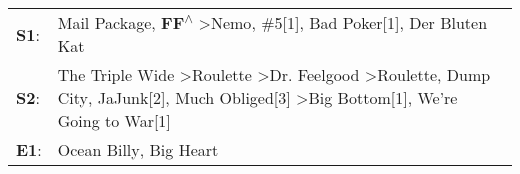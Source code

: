 \begin{supertabular}{p{0.03\textwidth}p{0.92\textwidth}}
 \textbf{S1}:  &                                                                                                                                                                        Mail Package\textsuperscript{}, \enspace \textbf{FF\textsuperscript{$\wedge$}} \textgreater \enspace Nemo\textsuperscript{}, \enspace \#5[1]\textsuperscript{}, \enspace Bad Poker[1]\textsuperscript{}, \enspace Der Bluten Kat\textsuperscript{}  \enspace  \\
 \textbf{S2}:  &  The Triple Wide\textsuperscript{} \textgreater \enspace Roulette\textsuperscript{} \textgreater \enspace Dr. Feelgood\textsuperscript{} \textgreater \enspace Roulette\textsuperscript{}, \enspace Dump City\textsuperscript{}, \enspace JaJunk[2]\textsuperscript{}, \enspace Much Obliged[3]\textsuperscript{} \textgreater \enspace Big Bottom[1]\textsuperscript{}, \enspace We're Going to War[1]\textsuperscript{}  \enspace  \\
 \textbf{E1}:  &                                                                                                                                                                                                                                                                                                                                                       Ocean Billy\textsuperscript{}, \enspace Big Heart\textsuperscript{}  \enspace  \\
\end{supertabular}
